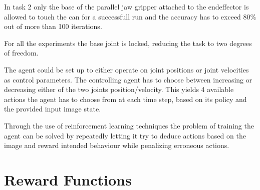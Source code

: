 \documentclass[10pt,journal,compsoc]{IEEEtran}
\begin{document}
In task 2 only the base of the parallel jaw gripper attached to the endeffector is allowed to touch the can for a successfull run and the accuracy has to exceed 80\% out of more than 100 iterations.

For all the experiments the base joint is locked, reducing the task to two degrees of freedom.

The agent could be set up to either operate on joint positions or joint velocities as control parameters.
The controlling agent has to choose between increasing or decreasing either of the two joints position/velocity. This yields 4 available actions the agent has to choose from at each time step, based on its policy and the provided input image state.

Through the use of reinforcement learning techniques the problem of training the agent can be solved by repeatedly letting it try to deduce actions based on the image and reward intended behaviour while penalizing erroneous actions.




\section{Reward Functions}  
\end{document}
